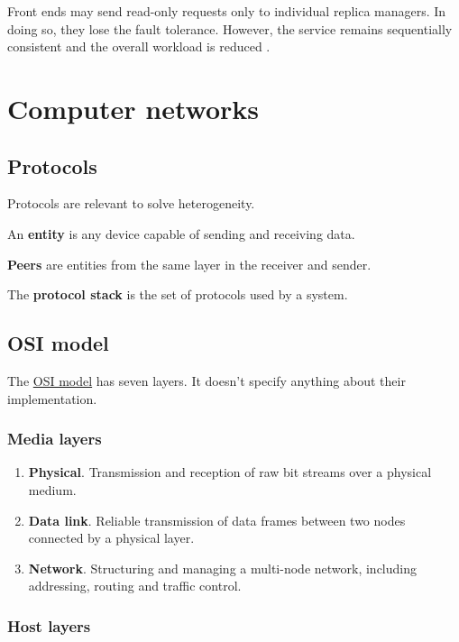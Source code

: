 \documentclass[12pt, oneside]{book}
\begin{document}
Front ends may send read-only requests only to individual replica managers.
In doing so, they lose the fault tolerance. However, the service remains sequentially consistent and the overall workload is reduced \cite[p.~782]{distributed-systems-coulouris-2013}.

\chapter{Computer networks}

\section{Protocols}

Protocols are relevant to solve heterogeneity.

An \textbf{entity} is any device capable of sending and receiving data.

\textbf{Peers} are entities from the same layer in the receiver and sender.

The \textbf{protocol stack} is the set of protocols used by a system.

\section{OSI model}

The \href{https://en.wikipedia.org/wiki/OSI_model}{OSI model} has seven layers. It doesn't specify anything about their implementation.

\subsection{Media layers}

\begin{enumerate}
\item \textbf{Physical}. Transmission and reception of raw bit streams over a physical medium.
\item \textbf{Data link}. Reliable transmission of data frames between two nodes connected by a physical layer.
\item \textbf{Network}. Structuring and managing a multi-node network, including addressing, routing and traffic control.
\end{enumerate}

\subsection{Host layers}
\end{document}
